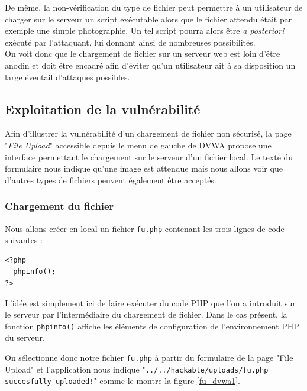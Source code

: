 De même, la non-vérification du type de fichier peut permettre à un utilisateur de charger sur le serveur un script exécutable alors que le fichier attendu était par exemple une simple photographie. Un tel script pourra alors être \textit{a posteriori} exécuté par l'attaquant, lui donnant ainsi de nombreuses possibilités.\\

On voit donc que le chargement de fichier sur un serveur web est loin d'être anodin et doit être encadré afin d'éviter qu'un utilisateur ait à sa disposition un large éventail d'attaques possibles.


\subsection{Exploitation de la vulnérabilité}

Afin d'illustrer la vulnérabilité d'un chargement de fichier non sécurisé, la page "\textit{File Upload}" accessible depuis le menu de gauche de DVWA propose une interface permettant le chargement sur le serveur d'un fichier local. Le texte du formulaire nous indique qu'une image est attendue mais nous allons voir que d'autres types de fichiers peuvent également être acceptés.

\subsubsection{Chargement du fichier}

Nous allons créer en local un fichier \texttt{fu.php} contenant les trois lignes de code suivantes :

\begin{lstlisting}
<?php
  phpinfo();
?>
\end{lstlisting}

L'idée est simplement ici de faire exécuter du code PHP que l'on a introduit sur le serveur par l'intermédiaire du chargement de fichier. Dans le cas présent, la fonction \texttt{phpinfo()} affiche les éléments de configuration de l'environnement PHP du serveur.

On sélectionne donc notre fichier \texttt{fu.php} à partir du formulaire de la page "File Upload" et l'application nous indique "\texttt{../../hackable/uploads/fu.php succesfully uploaded!}" comme le montre la figure \ref{fu_dvwa1}.

